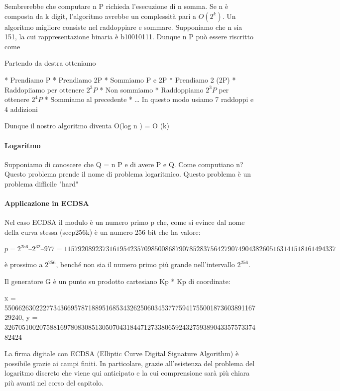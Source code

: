 \documentclass{book}
\theoremstyle{definition}
\begin{document}
Sembrerebbe che computare n P richieda l'esecuzione di n somma. Se n è composta da k digit, l'algoritmo avrebbe un complessità pari a $O(2^{k})$.
Un algoritmo migliore consiste nel raddoppiare e sommare. Supponiamo che n sia 151, la cui rappresentazione binaria è b10010111.
Dunque n P può essere riscritto come


Partendo da destra otteniamo

* Prendiamo P
* Prendiamo 2P
* Sommiamo P e 2P
* Prendiamo 2 (2P)
* Raddopiiamo per ottenere $2^{3}P$
* Non sommiamo
* Raddoppiamo $2^{3}P$ per ottenere $2^{4}P$
* Sommiamo al precedente
* \dots
In questo modo usiamo 7 raddoppi e 4 addizioni

Dunque il nostro algoritmo diventa O(log n ) = O (k)

\paragraph{Logaritmo}

Supponiamo di conoscere che Q = n P e di avere P e Q. Come computiano n?
Questo problema prende il nome di problema logaritmico.
Questo problema è un problema difficile "hard"

\paragraph{Applicazione in ECDSA}

Nel caso ECDSA il modulo è un numero primo p che, come si evince dal nome della curva stessa (secp256k) è un numero 256 bit che ha valore:

$$
p = 2^{256} – 2^{32} – 977 = 115792089237316195423570985008687907852837564279074904382605163141518161494337
$$

è prossimo a $2^{256}$, benché non sia il numero primo più grande nell'intervallo $2^{256}$.

Il generatore G è un punto su prodotto cartesiano Kp * Kp di coordinate:

x = 55066263022277343669578718895168534326250603453777594175500187360389116729240,
y = 32670510020758816978083085130507043184471273380659243275938904335757337482424


La firma digitale con ECDSA (Elliptic Curve Digital Signature Algorithm) è possibile grazie ai campi finiti.
In particolare, grazie all'esistenza del problema del logaritmo discreto che viene qui anticipato e la cui comprensione sarà più chiara più avanti nel corso del capitolo.
\end{document}
